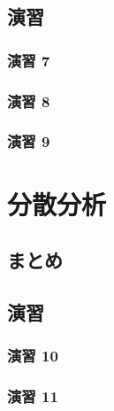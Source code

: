 \documentclass[
  12pt,
]{book}
\begin{document}
\hypertarget{ux6f14ux7fd2-7}{%
\subsection{演習}\label{ux6f14ux7fd2-7}}

\hypertarget{ux6f14ux7fd2-7-1}{%
\subsubsection*{演習 7}\label{ux6f14ux7fd2-7-1}}

\hypertarget{ux6f14ux7fd2-8}{%
\subsubsection*{演習 8}\label{ux6f14ux7fd2-8}}

\hypertarget{ux6f14ux7fd2-9}{%
\subsubsection*{演習 9}\label{ux6f14ux7fd2-9}}

\hypertarget{ux5206ux6563ux5206ux6790}{%
\section{分散分析}\label{ux5206ux6563ux5206ux6790}}

\hypertarget{ux307eux3068ux3081-4}{%
\subsection{まとめ}\label{ux307eux3068ux3081-4}}

\hypertarget{ux6f14ux7fd2-10}{%
\subsection{演習}\label{ux6f14ux7fd2-10}}

\hypertarget{ux6f14ux7fd2-10-1}{%
\subsubsection*{演習 10}\label{ux6f14ux7fd2-10-1}}

\hypertarget{ux6f14ux7fd2-11}{%
\subsubsection*{演習 11}\label{ux6f14ux7fd2-11}}
\end{document}
